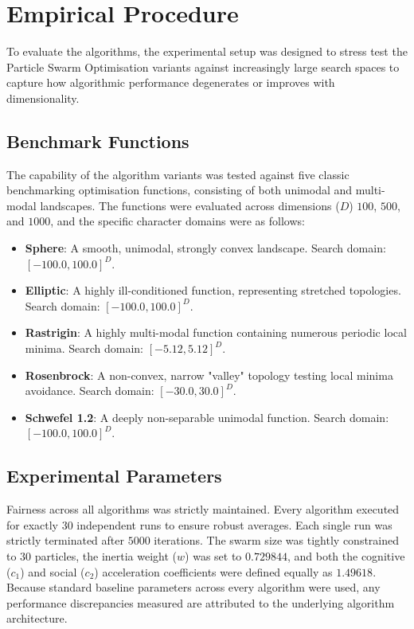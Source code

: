 \documentclass[conference]{IEEEtran}
\begin{document}
\section{Empirical Procedure}
    To evaluate the algorithms, the experimental setup was designed to stress test the Particle Swarm Optimisation 
    variants against increasingly large search spaces to capture how algorithmic performance degenerates or improves with dimensionality. 

\subsection{Benchmark Functions}
    The capability of the algorithm variants was tested against five classic benchmarking optimisation functions, consisting of both 
    unimodal and multi-modal landscapes. The functions were evaluated across dimensions ($D$) $100$, $500$, and $1000$, and the specific character domains 
    were as follows:
    
    \begin{itemize}
        \item \textbf{Sphere}: A smooth, unimodal, strongly convex landscape. Search domain: $[-100.0, 100.0]^D$.
        \item \textbf{Elliptic}: A highly ill-conditioned function, representing stretched topologies. Search domain: $[-100.0, 100.0]^D$.
        \item \textbf{Rastrigin}: A highly multi-modal function containing numerous periodic local minima. Search domain: $[-5.12, 5.12]^D$.
        \item \textbf{Rosenbrock}: A non-convex, narrow "valley" topology testing local minima avoidance. Search domain: $[-30.0, 30.0]^D$.
        \item \textbf{Schwefel 1.2}: A deeply non-separable unimodal function. Search domain: $[-100.0, 100.0]^D$.
    \end{itemize}

\subsection{Experimental Parameters}
    Fairness across all algorithms was strictly maintained. Every algorithm executed for exactly $30$ independent runs to ensure robust 
    averages. Each single run was strictly terminated after $5000$ iterations. 
    The swarm size was tightly constrained to $30$ particles, the inertia weight ($w$) was set to $0.729844$, and both the 
    cognitive ($c_1$) and social ($c_2$) acceleration coefficients were defined equally as $1.49618$.
    Because standard baseline parameters across every algorithm were used, any performance discrepancies measured are attributed to the 
    underlying algorithm architecture.
\end{document}
